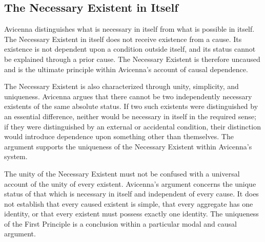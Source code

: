 
\subsection{The Necessary Existent in Itself}
\label{subsec:ch08-avicenna-necessary-existent}

\label{para:VS.B01.P01.C08.S13.SS07.P001}

Avicenna distinguishes what is
necessary in itself from what
is possible in itself. The
Necessary Existent in itself
does not receive existence from
a cause. Its existence is not
dependent upon a condition
outside itself, and its status
cannot be explained through
a prior cause. The Necessary
Existent is therefore uncaused
and is the ultimate principle
within Avicenna's account of
causal dependence.
\citep[Ilahiyyat, I.6--7]{AvicennaMetaphysics}

\label{para:VS.B01.P01.C08.S13.SS07.P002}

The Necessary Existent is also
characterized through unity,
simplicity, and uniqueness.
Avicenna argues that there
cannot be two independently
necessary existents of the
same absolute status. If two
such existents were distinguished
by an essential difference,
neither would be necessary
in itself in the required
sense; if they were distinguished
by an external or accidental
condition, their distinction
would introduce dependence
upon something other than
themselves. The argument
supports the uniqueness of
the Necessary Existent within
Avicenna's system.
\citep[Ilahiyyat, I.7 and VIII.4]{AvicennaMetaphysics}

\label{para:VS.B01.P01.C08.S13.SS07.P003}

The unity of the Necessary
Existent must not be confused
with a universal account of
the unity of every existent.
Avicenna's argument concerns
the unique status of that
which is necessary in itself
and independent of every
cause. It does not establish
that every caused existent
is simple, that every
aggregate has one identity,
or that every existent must
possess exactly one identity.
The uniqueness of the First
Principle is a conclusion
within a particular modal
and causal argument.
\citep[Ilahiyyat, I.6--7]{AvicennaMetaphysics}

